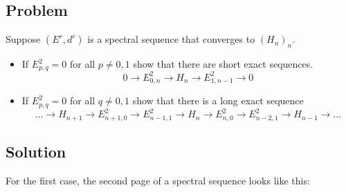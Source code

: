 \documentclass{article}
\begin{document}
\subsection*{Problem}
Suppose $(E^r,d^r)$ is a spectral sequence that converges to $(H_n)_n$.
\begin{itemize}
\item If $E^2_{p,q} = 0$ for all $p \neq 0,1$ show that there are short exact sequences.
\begin{equation*}
0 \to E^2_{0,n} \to H_n \to E^2_{1,n-1} \to 0
\end{equation*}
\item If $E^2_{p,q} = 0$ for all $q \neq 0,1$ show that there is a long exact sequence
\begin{equation*}
\dots \to H_{n+1} \to E^2_{n+1,0} \to E^2_{n-1,1} \to H_n \to E^2_{n,0} \to E^2_{n-2,1} \to H_{n-1} \to \dots
\end{equation*}
\end{itemize}
\subsection*{Solution}
For the first case, the second page of a spectral sequence looks like this:

\begin{center}\end{center}
\end{document}
